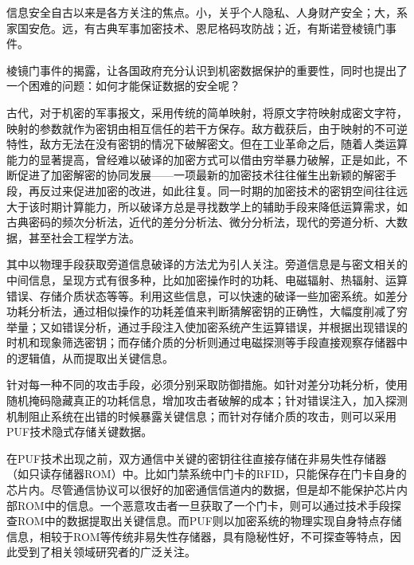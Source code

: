 
信息安全自古以来是各方关注的焦点。小，关乎个人隐私、人身财产安全；大，系家国安危。远，有古典军事加密技术、恩尼格码攻防战；近，有斯诺登棱镜门事件。

棱镜门事件的揭露，让各国政府充分认识到机密数据保护的重要性，同时也提出了一个困难的问题：如何才能保证数据的安全呢？

古代，对于机密的军事报文，采用传统的简单映射，将原文字符映射成密文字符，映射的参数就作为密钥由相互信任的若干方保存。敌方截获后，由于映射的不可逆特性，敌方无法在没有密钥的情况下破解密文。但在工业革命之后，随着人类运算能力的显著提高，曾经难以破译的加密方式可以借由穷举暴力破解，正是如此，不断促进了加密解密的协同发展——一项最新的加密技术往往催生出新颖的解密手段，再反过来促进加密的改进，如此往复。同一时期的加密技术的密钥空间往往远大于该时期计算能力，所以破译方总是寻找数学上的辅助手段来降低运算需求，如古典密码的频次分析法，近代的差分分析法、微分分析法，现代的旁道分析、大数据，甚至社会工程学方法。

其中以物理手段获取旁道信息破译的方法尤为引人关注。旁道信息是与密文相关的中间信息，呈现方式有很多种，比如加密操作时的功耗、电磁辐射、热辐射、运算错误、存储介质状态等等。利用这些信息，可以快速的破译一些加密系统。如差分功耗分析法，通过相似操作的功耗差值来判断猜解密钥的正确性，大幅度削减了穷举量；又如错误分析，通过手段注入使加密系统产生运算错误，并根据出现错误的时机和现象筛选密钥；而存储介质的分析则通过电磁探测等手段直接观察存储器中的逻辑值，从而提取出关键信息。

针对每一种不同的攻击手段，必须分别采取防御措施。如针对差分功耗分析，使用随机掩码隐藏真正的功耗信息，增加攻击者破解的成本；针对错误注入，加入探测机制阻止系统在出错的时候暴露关键信息；而针对存储介质的攻击，则可以采用PUF技术隐式存储关键数据。

在PUF技术出现之前，双方通信中关键的密钥往往直接存储在非易失性存储器（如只读存储器ROM）中。比如门禁系统中门卡的RFID，只能保存在门卡自身的芯片内。尽管通信协议可以很好的加密通信信道内的数据，但是却不能保护芯片内部ROM中的信息。一个恶意攻击者一旦获取了一个门卡，则可以通过技术手段探查ROM中的数据提取出关键信息。而PUF则以加密系统的物理实现自身特点存储信息，相较于ROM等传统非易失性存储器，具有隐秘性好，不可探查等特点，因此受到了相关领域研究者的广泛关注。

